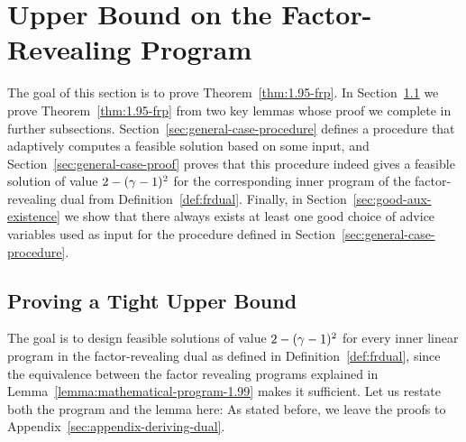 \section{Upper Bound on the Factor-Revealing Program}\label{sec:195-dual-fitting}

The goal of this section is to prove Theorem~\ref{thm:1.95-frp}.
In Section~\ref{sec:proof-thm-195} we prove Theorem~\ref{thm:1.95-frp} from two key lemmas whose proof we complete in further subsections.
Section~\ref{sec:general-case-procedure} defines a procedure that adaptively computes a feasible solution based on some input, and Section~\ref{sec:general-case-proof} proves that this procedure indeed gives a feasible solution of value $2-(\gamma-1)^2$ for the corresponding inner program of the factor-revealing dual from Definition~\ref{def:frdual}.
Finally, in Section~\ref{sec:good-aux-existence} we show that there always exists at least one good choice of advice variables used as input for the procedure defined in Section~\ref{sec:general-case-procedure}.

\subsection{Proving a Tight Upper Bound}\label{sec:proof-thm-195}

The goal is to design feasible solutions of value $2-(\gamma-1)^2$ for every inner linear program in the factor-revealing dual as defined in Definition~\ref{def:frdual}, since the equivalence between the factor revealing programs explained in Lemma~\ref{lemma:mathematical-program-1.99} makes it sufficient. Let us restate both the program and the lemma here:
\lemmamathematicalprogram*
As stated before, we leave the proofs to Appendix~\ref{sec:appendix-deriving-dual}.

